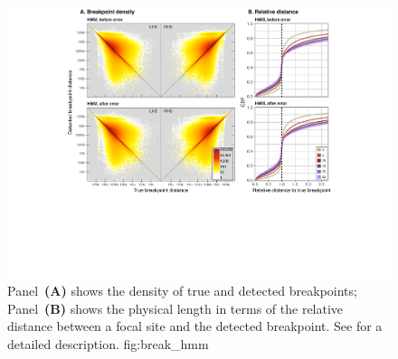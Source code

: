 

\begin{figure}[!htbp]
\includegraphics[width=\textwidth]{./img/ch4/break_hmm}
{Panel~\textbf{(A)} shows the density of true and detected breakpoints; Panel~\textbf{(B)} shows the physical length in terms of the relative distance between a focal site and the detected breakpoint.
See  for a detailed description.}
{fig:break_hmm}
\end{figure}
